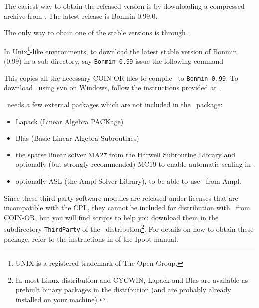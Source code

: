 The easiest way to obtain the released version is by downloading a compressed archive from . The latest release is Bonmin-0.99.0.

The only way to obain one of the stable versions is through .

In Unix\footnote{UNIX is a registered trademark of The Open
Group.}-like environments, to download the latest stable version of Bonmin (0.99) in a sub-directory, say {\tt Bonmin-0.99} 
issue the following command
\break

\begin{colorverb}
\end{colorverb}

\noindent This copies all the necessary COIN-OR files to compile \Bonmin\ to
{\tt Bonmin-0.99}. To download \Bonmin\ using svn on Windows,
follow the instructions provided at
.

\Bonmin\ needs a few external packages which are not included in the \Bonmin\ package:
\begin{itemize}
\item Lapack (Linear Algebra PACKage)
\item Blas (Basic Linear Algebra Subroutines)
\item the sparse linear solver MA27 from the Harwell Subroutine Library and optionally (but strongly recommended) MC19 to enable automatic scaling in \Ipopt.
\item optionally ASL (the Ampl Solver Library), to be able to use \Bonmin\ from Ampl.
\end{itemize}

Since these third-party software modules are released under licenses
that are incompatible with the CPL, they cannot be included for
distribution with \Bonmin\ from COIN-OR, but you will find scripts
to help you download them in the subdirectory {\tt ThirdParty} of
the \Bonmin\ distribution\footnote{In most Linux distribution and
CYGWIN, Lapack and Blas are available as prebuilt binary packages in
the distribution (and are probably already installed on your
machine).}. For details on how to obtain these package, refer to the
instructions in
 of the Ipopt manual.\\
